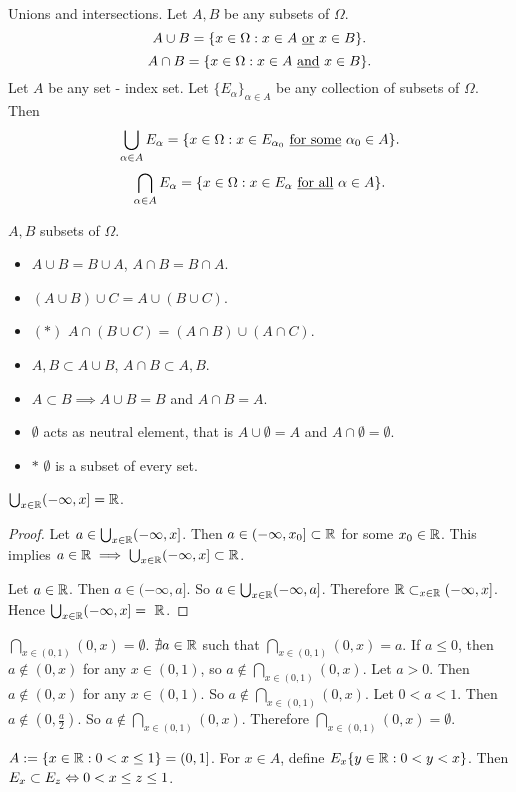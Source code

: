 \documentclass[]{article}
\begin{document}
Unions and intersections. Let $A,B$ be any subsets of $\Omega$.
$$A\cup B = \{ x\in \Omega : x\in A \text{ \underline{or} } x\in B\}.$$
$$A\cap B = \{x\in \Omega : x\in A \text{ \underline{and} } x\in B\}.$$
Let $A$ be any set - index set.
Let $\{E_\alpha\}_{\alpha\in A}$ be any collection of subsets of $\Omega$.
Then $$\bigcup_{\alpha\in A} E_\alpha = \{ x\in \Omega: x\in E_{\alpha_0} \text{ \underline{for some} } \alpha_0\in A\}.$$
$$ \bigcap_{\alpha\in A} E_\alpha = \{x\in \Omega: x\in E_\alpha \text{ \underline{for all} } \alpha\in A\}.$$
\begin{remark}
	$A,B$ subsets of $\Omega$.
	\begin{itemize}
		\item $A\cup B = B\cup A$, $A\cap B = B\cap A$.
		\item $(A\cup B)\cup C = A\cup(B\cup C)$.
		\item $(*)$ $A\cap (B\cup C) = (A\cap B)\cup (A\cap C)$.
		\item $A,B\subset A\cup B$, $A\cap B\subset A,B$.
		\item $A\subset B \implies A\cup B = B$ and $A\cap B = A$.
		\item $\emptyset$ acts as neutral element, that is $A\cup \emptyset = A$ and $A\cap \emptyset = \emptyset$.
		\item $*$ $\emptyset$ is a subset of every set.
	\end{itemize}
\end{remark}
\begin{example}
	$\bigcup_{x\in\mathbb{R}} (-\infty,x] = \mathbb{R}$.
	\begin{proof}
		\say{$\subset$} Let $a\in\bigcup_{x\in\mathbb{R}}(-\infty,x]$.
		Then $a\in(-\infty,x_0]\subset\mathbb{R}$ for some $x_0\in\mathbb{R}$.
		This implies $a\in\mathbb{R}\implies \bigcup_{x\in\mathbb{R}}(-\infty,x]\subset \mathbb{R}$.

		\say{$\supset$} Let $a\in\mathbb{R}$. Then $a\in(-\infty,a]$. So $a\in\bigcup_{x\in\mathbb{R}}(-\infty,a]$. Therefore $\mathbb{R}\subset_{x\in\mathbb{R}} (-\infty,x]$. Hence $\bigcup_{x\in\mathbb{R}} (-\infty,x] =~\mathbb{R}$.
	\end{proof}
\end{example}
\begin{example}
	$\bigcap_{x\in(0,1)}(0,x) = \emptyset$. $\nexists a\in\mathbb{R}$ such that $\bigcap_{x\in(0,1)}(0,x) = a$.
	If $a\leq 0$, then $a\notin(0,x)$ for any $x\in(0,1)$, so $a\notin\bigcap_{x\in(0,1)}(0,x)$.
	Let $a>0$. Then $a\notin (0,x)$ for any $x\in(0,1)$. So $a\notin \bigcap_{x\in(0,1)}(0,x)$.
	Let $0<a<1$. Then $a\notin(0,\frac{a}{2})$. So $a\notin \bigcap_{x\in(0,1)}(0,x)$. Therefore $\bigcap_{x\in(0,1)}(0,x) = \emptyset$.
\end{example}
\begin{example}
	[*] $A:=\{x\in\mathbb{R}: 0<x\leq 1\} = (0,1]$. For $x\in A$, define $E_x\{y\in\mathbb{R}: 0<y<x\}$.
	Then $E_x\subset E_z \Leftrightarrow 0<x\leq z \leq 1$.
\end{example}
\end{document}
